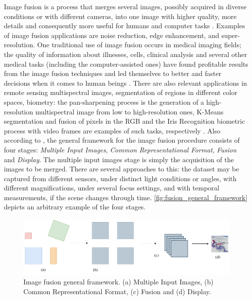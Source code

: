 Image fusion is a process that merges several images, possibly acquired in diverse conditions or with different cameras, into one image with higher quality, more details and consequently more useful for humans and computer tasks \cite{mitchell2010image}. Examples of image fusion applications are noise reduction, edge enhancement, and super-resolution. One traditional use of image fusion occurs in medical imaging fields; the quality of information about illnesses, cells, clinical analysis and several other medical tasks (including the computer-assisted ones) have found profitable results from the image fusion techniques and led themselves to better and faster decisions when it comes to human beings \cite{james2014medical}. There are also relevant applications in remote sensing multispectral images, segmentation of regions in different color spaces, biometry: the pan-sharpening process is the generation of a high-resolution multispectral image from low to high-resolution ones, K-Means segmentation and fusion of pixels in the RGB and the Iris Recognition biometric process with video frames are examples of such tasks, respectively \cite{mitchell2010image}. Also according to , the general framework for the image fusion procedure consists of four stages: \emph{Multiple Input Images}, \emph{Common Representational Format}, \emph{Fusion} and \emph{Display}. The multiple input images stage is simply the acquisition of the images to be merged. There are several approaches to this: the dataset may be captured from different sensors, under distinct light conditions or angles, with different magnifications, under several focus settings, and with temporal measurements, if the scene changes through time. \autoref{fig:fusion_general_framework} depicts an arbitrary example of the four stages. 

\begin{figure}[ht]
	\centering
	\caption{\label{fig:fusion_general_framework}Image fusion general framework. (a) Multiple Input Images, (b) Common Representational Format, (c) Fusion and (d) Display.}
	\begin{center}
    \includegraphics[scale=0.45, trim={0 -1.5cm 0cm -1.5cm}, clip]{images/image_fusion_scheme.png}
	\end{center}
	\centering
    \fautor
\end{figure}

